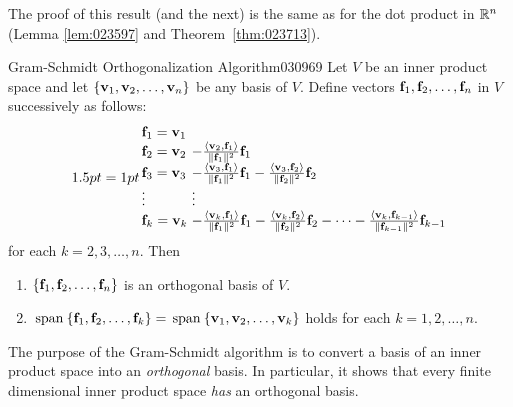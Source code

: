 The proof of this result (and the next) is the same as for the dot product in $\mathbb{R}^n$ (Lemma \ref{lem:023597} and Theorem~\ref{thm:023713}).

\begin{theorem}{Gram-Schmidt Orthogonalization Algorithm}{030969}
Let $V$ be an inner product space and let $\{\textbf{v}_{1}, \textbf{v}_{2}, \dots, \textbf{v}_{n}\}$ be any basis of $V$. Define vectors $\textbf{f}_{1}, \textbf{f}_{2}, \dots, \textbf{f}_{n}$ in $V$ successively as follows:
\begin{equation*}
\arraycolsep=1pt
\begin{array}{ll}
\vect{f}_1 = \vect{v}_1 & \\
\vect{f}_2 = \vect{v}_2 &
- \frac{\langle \vect{v}_2, \vect{f}_1 \rangle}{\vectlength \vect{f}_1 \vectlength ^2} \vect{f}_1 \\
\vect{f}_3 = \vect{v}_3 &
- \frac{\langle \vect{v}_3, \vect{f}_1 \rangle}{\vectlength \vect{f}_1 \vectlength ^2} \vect{f}_1 
- \frac{\langle \vect{v}_3, \vect{f}_2 \rangle}{\vectlength \vect{f}_2 \vectlength ^2} \vect{f}_ 2 \\
\vdots & \vdots \\
\vect{f}_k = \vect{v}_k &
- \frac{\langle \vect{v}_k, \vect{f}_1 \rangle}{\vectlength \vect{f}_1 \vectlength ^2} \vect{f}_1 
- \frac{\langle \vect{v}_k, \vect{f}_2 \rangle}{\vectlength \vect{f}_2 \vectlength ^2} \vect{f}_2
- \dots
- \frac{\langle \vect{v}_k, \vect{f}_{k - 1} \rangle}{\vectlength \vect{f}_{k - 1} \vectlength ^2}\vect{f}_{k - 1} \\
\end{array}
\end{equation*}
for each $k = 2, 3, \dots, n$. Then
\begin{enumerate}
\item $\{\textbf{f}_{1}, \textbf{f}_{2}, \dots, \textbf{f}_{n}\}$ is an orthogonal basis of $V$.

\item $\thinspace\operatorname{span\medspace}\{\textbf{f}_{1}, \textbf{f}_{2}, \dots, \textbf{f}_{k}\} = \thinspace\operatorname{span\medspace}\{\textbf{v}_{1}, \textbf{v}_{2}, \dots, \textbf{v}_{k}\}$ holds for each $k = 1, 2, \dots, n$.

\end{enumerate}
\end{theorem}

\noindent The purpose of the Gram-Schmidt algorithm is to convert a basis of an inner product space into an \textit{orthogonal} basis. In particular, it shows that every finite dimensional inner product space \textit{has} an orthogonal basis.

